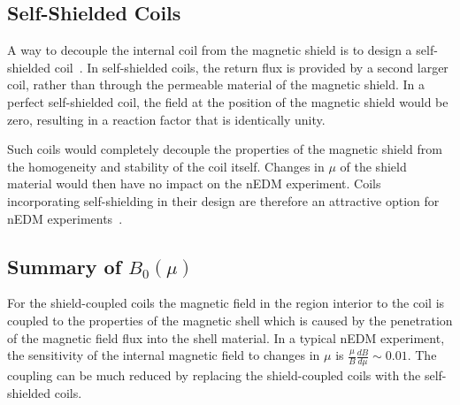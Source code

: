 \documentclass[review]{elsarticle}
\begin{document}

\subsection{Self-Shielded Coils}

A way to decouple the internal coil from the magnetic shield is to design
a self-shielded
coil~\cite{bib:cpviolwithoutstrangeness,bib:someotherselfshieldedcoilpapers}.
In self-shielded coils, the return flux is provided by a second larger
coil, rather than through the permeable material of the magnetic
shield.  In a perfect self-shielded coil, the field at the position of
the magnetic shield would be zero, resulting in a reaction factor that
is identically unity.

Such coils would completely decouple the properties of the magnetic
shield from the homogeneity and stability of the coil itself.  Changes
in $\mu$ of the shield material would then have no impact on the nEDM
experiment.  Coils incorporating self-shielding in their design are
therefore an attractive option for nEDM
experiments~\cite{bib:cpviolwithoutstrangeness}.



\subsection{Summary of $B_0(\mu)$}
For the shield-coupled coils the magnetic field in the region interior
to the coil is coupled to the properties of the magnetic shell which is caused
by the penetration of the magnetic field flux into the shell material. In a
typical nEDM experiment, the sensitivity of the internal magnetic
field to changes in $\mu$ is $\frac{\mu}{B}\frac{dB}{d\mu}\sim 0.01$.
The coupling can be much reduced by replacing the shield-coupled coils
with the self-shielded coils.
\end{document}
